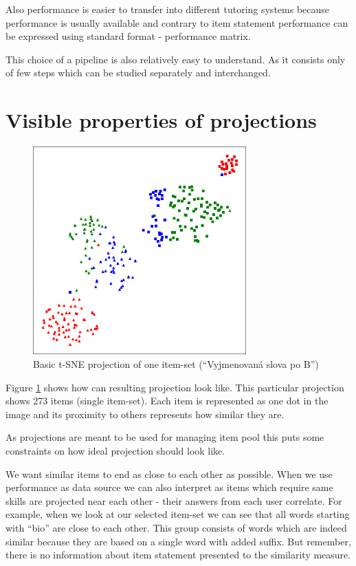 \documentclass[
  digital, %
  table,   %
  nolof,     %
  nolot,     %
  nocover,
  color
]{fithesis3}
\begin{document}
Also performance is easier to transfer into different tutoring systems because performance is usually available and contrary to item statement performance can be expressed using standard format - performance matrix.

This choice of a pipeline is also relatively easy to understand. As it consists only of few steps which can be studied separately and interchanged.

\section{Visible properties of projections}\label{visible-properties-of-projections}


\begin{figure}
    \includegraphics[height=8cm]{img/common_projection}
  \caption{Basic t-SNE projection of one item-set (``Vyjmenovaná slova po B'')}
  \label{fig:common_projection}
\end{figure}

Figure \ref{fig:common_projection} shows how can resulting projection look like. This particular projection shows 273 items (single item-set). Each item is represented as one dot in the image and its proximity to others represents how similar they are.


As projections are meant to be used for managing item pool this puts some constraints on how ideal projection should look like.

We want similar items to end as close to each other as possible. When we use performance as data source we can also interpret as items which require same skills are projected near each other - their answers from each user correlate. For example, when we look at our selected item-set we can see that all words starting with ``bio'' are close to each other. This group consists of words which are indeed similar because they are based on a single word with added suffix. But remember, there is no information about item statement presented to the similarity measure.
\end{document}
